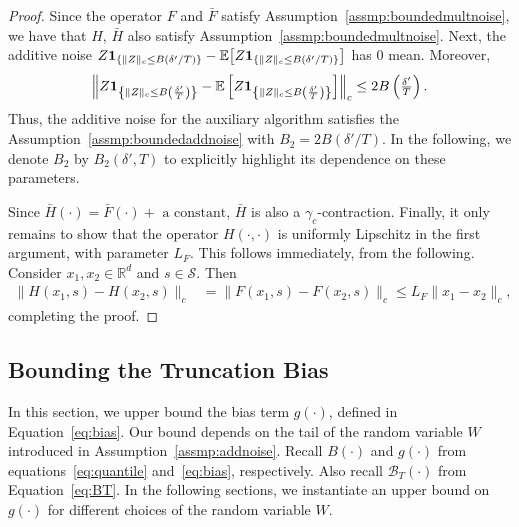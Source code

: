\documentclass{article}
\newcommand{\lrp}[1]{\left( #1 \right)}
\newcommand{\lrs}[1]{\left[ #1 \right]}
\newcommand{\E}[1]{\mathbb{E}\lrs{#1}}
\newcommand{\R}{\mathbb{R}}
\begin{document}
\begin{proof}
Since the operator $F$ and $\bar{F}$ satisfy Assumption~\ref{assmp:boundedmultnoise}, we have that $H$, $\bar{H}$ also satisfy Assumption~\ref{assmp:boundedmultnoise}. Next, the additive noise $Z {\bf 1}_{\{\|Z\|_c \le B(\delta'/T)\}} - \mathbb{E}\big[{Z{\bf 1}_{\{\|Z\|_c \le B(\delta'/T)\}}}\big]$ has $0$ mean. Moreover, 
\begin{align*}
    \left\|Z {\bf 1}_{\left\{\|Z\|_c \le B\lrp{\frac{\delta'}{T}}\right\}} - \E{Z {\bf 1}_{\left\{\|Z\|_c \le B\lrp{\frac{\delta'}{T}}\right\}}}\right\|_c
    \le 2B\lrp{\tfrac{\delta'}{T}}. 
\end{align*}
Thus, the additive noise for the auxiliary algorithm satisfies the Assumption~\ref{assmp:boundedaddnoise} with $B_2 = 2 B(\delta'/T)$. In the following, we denote $B_2$ by $B_2(\delta',T)$ to explicitly highlight its dependence on these parameters. 

Since $\bar{H}(\cdot) = \bar{F}(\cdot) + \text{ a constant}$, $\bar{H}$ is also a $\gamma_c$-contraction. Finally, it only remains to show that the operator $H(\cdot,\cdot)$ is uniformly Lipschitz in the first argument,  with parameter  $L_F$. This follows immediately, from the following. Consider $x_1, x_2 \in \R^d$ and $s\in \mathcal S$. Then 
\begin{align*}
    \|H(x_1, s) - H(x_2, s)\|_c &= \|F(x_1, s) - F(x_2, s)\|_c \le L_F\|x_1 - x_2\|_c, 
\end{align*}
completing the proof.
\end{proof}


\subsection{Bounding the Truncation Bias}\label{app:boundbias}
In this section, we upper bound the bias term $g(\cdot)$, defined in Equation~\eqref{eq:bias}. Our bound depends on the tail of the random variable $W$ introduced in Assumption~\ref{assmp:addnoise}.  Recall $B(\cdot)$ and $g(\cdot)$ from equations~\eqref{eq:quantile} and~\eqref{eq:bias}, respectively. Also recall  $\mathcal B_T(\cdot)$ from Equation~\eqref{eq:BT}. In the following sections, we instantiate an upper bound on $g(\cdot)$ for different choices of the random variable $W$. 
\end{document}
